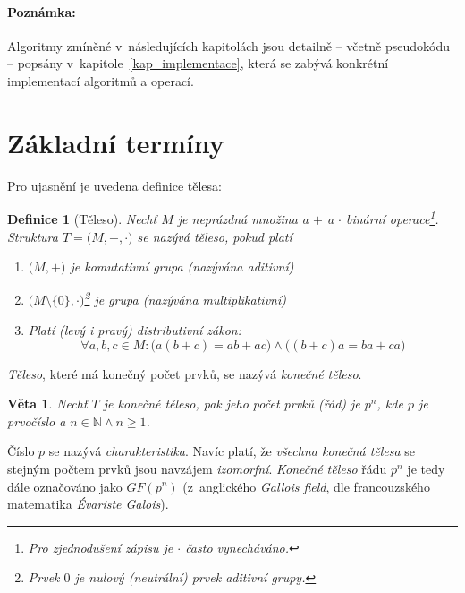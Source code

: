 \documentclass[thesis=M,czech,hidelinks]{FITthesis}[2012/06/26]
\newcommand{\0}{{\textcolor[gray]{0.75}{0}}}
\newtheorem{definice}{Definice}
\newtheorem{veta}{Věta}
\begin{document}
\paragraph{Poznámka:} Algoritmy zmíněné v~následujících kapitolách jsou detailně
-- včetně pseudokódu -- popsány v~kapitole~\ref{kap_implementace}, která se
zabývá konkrétní implementací algoritmů a operací.



\section{Základní termíny}

Pro ujasnění je uvedena definice tělesa:

\begin{definice}[Těleso]
    Nechť $M$ je neprázdná množina a $+$ a $\cdot$ binární operace\footnote{
        Pro zjednodušení zápisu je $\cdot$ často vynecháváno.
    }. Struktura
    $T=\big(M, +, \cdot \big)$ se nazývá těleso, pokud platí
    \begin{enumerate}
        \item $\big(M, +\big)$ je \emph{komutativní grupa} (nazývána
            \emph{aditivní})
        \item $\big(M\setminus\{\mathit{0}\}, \cdot \big)$\footnote{
                Prvek $\mathit{0}$ je \emph{nulový} (\emph{neutrální}) prvek
                \emph{aditivní grupy}.
            } je \emph{grupa} (nazývána
            \emph{multiplikativní})
        \item Platí (levý i pravý) \emph{distributivní zákon}:
            $$
                \forall a,b,c \in M :
                \big( a(b+c) = a b + a c \big) \land
                \big( (b+c)a = b a + c a \big)
            $$

    \end{enumerate}
\end{definice}
\emph{Těleso}, které má konečný počet prvků, se nazývá \emph{konečné těleso}.

\begin{veta}
    Nechť $T$ je \emph{konečné těleso}, pak jeho počet prvků (\emph{řád}) je
    $p^n$, kde $p$ je prvočíslo a $n \in \mathbb{N} \land n \geq 1 $.
\end{veta}

Číslo $p$ se nazývá \emph{charakteristika}. Navíc platí, že \emph{všechna
konečná tělesa} se stejným počtem prvků jsou navzájem \emph{izomorfní}.
\emph{Konečné těleso} řádu $p^n$ je tedy dále označováno jako $GF(p^n)$
(z~anglického \emph{Gallois field}, dle francouzského matematika \emph{Évariste
Galois}).
\end{document}
